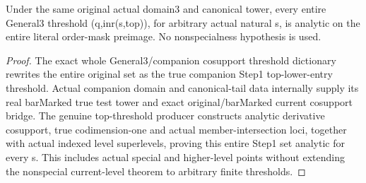 \begin{theorem}
\label{hir:dimension-three-actual-general-special-top-thresholds}
\leanok
Under the same original actual domain3 and canonical tower, every entire
General3 threshold (q,inr(s,top)), for arbitrary actual natural s, is analytic
on the entire literal order-mask preimage. No nonspecialness hypothesis is used.
\end{theorem}
\begin{proof}
The exact whole General3/companion cosupport threshold dictionary rewrites the
entire original set as the true companion Step1 top-lower-entry threshold.
Actual companion domain and canonical-tail data internally supply its real
barMarked true test tower and exact original/barMarked current cosupport
bridge. The genuine top-threshold producer constructs analytic derivative
cosupport, true codimension-one and actual member-intersection loci, together
with actual indexed level superlevels, proving this entire Step1 set analytic
for every s. This includes actual special and higher-level points without
extending the nonspecial current-level theorem to arbitrary finite thresholds.
\end{proof}
